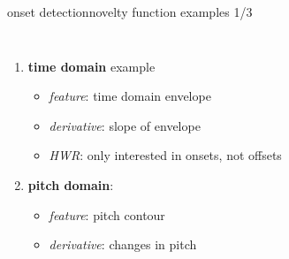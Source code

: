         \begin{frame}{onset detection}{novelty function examples 1/3}
            \vspace{-5mm}
            \begin{columns}
            \begin{enumerate}
                \item	\textbf{time domain} example
                    \begin{itemize}
                        \item	\textit{feature}: time domain envelope
                        \item   \textit{derivative}:	slope of envelope
                        \item   \textit{HWR}: only interested in onsets, not offsets
                    \end{itemize}
                \bigskip    
                \bigskip
                \item<2->	\textbf{pitch domain}: 
                    \begin{itemize}
                        \item	\textit{feature}: pitch contour
                        \item   \textit{derivative}: changes in pitch
                    \end{itemize}
            \end{enumerate}
            \vspace{-5mm}
            \end{columns}
        \end{frame}
